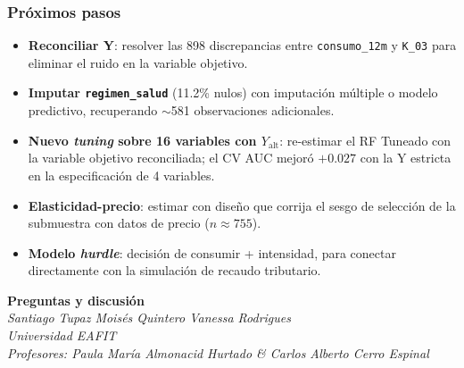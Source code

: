 \begin{frame}
\frametitle{Próximos pasos}
\begin{itemize}
    \item \textbf{Reconciliar Y}: resolver las 898 discrepancias entre \texttt{consumo\_12m} y \texttt{K\_03} para eliminar el ruido en la variable objetivo.

    \vspace{0.15cm}
    \item \textbf{Imputar \texttt{regimen\_salud}} (11.2\% nulos) con imputación múltiple o modelo predictivo, recuperando $\sim$581 observaciones adicionales.

    \vspace{0.15cm}
    \item \textbf{Nuevo \textit{tuning} sobre 16 variables con $Y_{\text{alt}}$}: re-estimar el RF Tuneado con la variable objetivo reconciliada; el CV AUC mejoró $+0.027$ con la Y estricta en la especificación de 4 variables.

    \vspace{0.15cm}
    \item \textbf{Elasticidad-precio}: estimar con diseño que corrija el sesgo de selección de la submuestra con datos de precio ($n \approx 755$).

    \vspace{0.15cm}
    \item \textbf{Modelo \textit{hurdle}}: decisión de consumir + intensidad, para conectar directamente con la simulación de recaudo tributario.
\end{itemize}
\end{frame}

\begin{frame}[plain]
\centering
\Huge \textbf{Preguntas y discusión}
\vspace{0.8cm}
\\[0.4cm]
\normalsize
\textit{Santiago Tupaz \quad Moisés Quintero \quad Vanessa Rodrigues}\\[0.2cm]
\textit{Universidad EAFIT}\\[0.4cm]
\small
\textit{Profesores: Paula María Almonacid Hurtado \& Carlos Alberto Cerro Espinal}
\end{frame}
